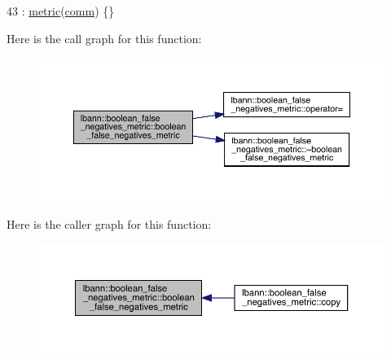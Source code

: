 \begin{DoxyCode}
43 : \hyperlink{classlbann_1_1metric_a3cd2d4f7dcbf94f70b3b8560a3171d9d}{metric}(\hyperlink{file__io_8cpp_ab048c6f9fcbcfaa57ce68b00263dbebe}{comm}) \{\}
\end{DoxyCode}
Here is the call graph for this function\+:\nopagebreak
\begin{figure}[H]
\begin{center}
\leavevmode
\includegraphics[width=350pt]{classlbann_1_1boolean__false__negatives__metric_abb7220421c393713e5a79a3da3b4b79c_cgraph}
\end{center}
\end{figure}
Here is the caller graph for this function\+:\nopagebreak
\begin{figure}[H]
\begin{center}
\leavevmode
\includegraphics[width=350pt]{classlbann_1_1boolean__false__negatives__metric_abb7220421c393713e5a79a3da3b4b79c_icgraph}
\end{center}
\end{figure}
\mbox{\label{classlbann_1_1boolean__false__negatives__metric_ad064e2cf0b555cb1e4d2fb18874e8c77}} 
